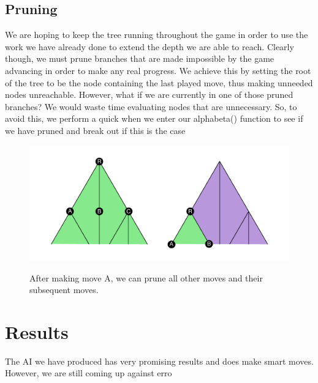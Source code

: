 \documentclass[a4paper, 12pt]{article}
\begin{document}
\begin{figure}[!h]
\centering
{}
\end{figure}
\subsection{Pruning}
We are hoping to keep the tree running throughout the game in order to use the work we have already done to extend the depth we are able to reach. Clearly though, we must prune branches that are made impossible by the game advancing in order to make any real progress. We achieve this by setting the root of the tree to be the node containing the last played move, thus making unneeded nodes unreachable. However, what if we are currently in one of those pruned branches? We would waste time evaluating nodes that are unnecessary. So, to avoid this, we perform a quick when we enter our alphabeta() function to see if we have pruned and break out if this is the case
\begin{figure}[h!]
  \centering
  	\includegraphics[width = 17cm]{TreePruning}\\
  \caption{After making move A, we can prune all other moves and their subsequent moves.}
\end{figure}
\section{Results}
The AI we have produced has very promising results and does make smart moves. However, we are still coming up against erro
\end{document}

